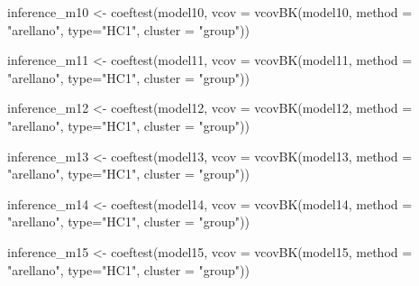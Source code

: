 \documentclass[a4paper,nobind]{templates/ociamthesis}
\newenvironment{Shaded}{\begin{snugshade}}{\end{snugshade}}
\newcommand{\AttributeTok}[1]{\textcolor[rgb]{0.77,0.63,0.00}{#1}}
\newcommand{\FunctionTok}[1]{\textcolor[rgb]{0.00,0.00,0.00}{#1}}
\newcommand{\NormalTok}[1]{#1}
\newcommand{\OtherTok}[1]{\textcolor[rgb]{0.56,0.35,0.01}{#1}}
\newcommand{\StringTok}[1]{\textcolor[rgb]{0.31,0.60,0.02}{#1}}
\renewenvironment{Shaded}
{
  \vspace{10pt}%
  \begin{snugshade}%
}{%
  \end{snugshade}%
  \vspace{8pt}%
}
\begin{document}
\begin{Shaded}
\begin{Highlighting}[]
\NormalTok{inference\_m10 }\OtherTok{\textless{}{-}} \FunctionTok{coeftest}\NormalTok{(model10, }\AttributeTok{vcov =} \FunctionTok{vcovBK}\NormalTok{(model10, }\AttributeTok{method =} \StringTok{"arellano"}\NormalTok{, }\AttributeTok{type=}\StringTok{"HC1"}\NormalTok{, }\AttributeTok{cluster =} \StringTok{"group"}\NormalTok{))}

\NormalTok{inference\_m11 }\OtherTok{\textless{}{-}} \FunctionTok{coeftest}\NormalTok{(model11, }\AttributeTok{vcov =} \FunctionTok{vcovBK}\NormalTok{(model11, }\AttributeTok{method =} \StringTok{"arellano"}\NormalTok{, }\AttributeTok{type=}\StringTok{"HC1"}\NormalTok{, }\AttributeTok{cluster =} \StringTok{"group"}\NormalTok{))}

\NormalTok{inference\_m12 }\OtherTok{\textless{}{-}} \FunctionTok{coeftest}\NormalTok{(model12, }\AttributeTok{vcov =} \FunctionTok{vcovBK}\NormalTok{(model12, }\AttributeTok{method =} \StringTok{"arellano"}\NormalTok{, }\AttributeTok{type=}\StringTok{"HC1"}\NormalTok{, }\AttributeTok{cluster =} \StringTok{"group"}\NormalTok{))}

\NormalTok{inference\_m13 }\OtherTok{\textless{}{-}} \FunctionTok{coeftest}\NormalTok{(model13, }\AttributeTok{vcov =} \FunctionTok{vcovBK}\NormalTok{(model13, }\AttributeTok{method =} \StringTok{"arellano"}\NormalTok{, }\AttributeTok{type=}\StringTok{"HC1"}\NormalTok{, }\AttributeTok{cluster =} \StringTok{"group"}\NormalTok{))}

\NormalTok{inference\_m14 }\OtherTok{\textless{}{-}} \FunctionTok{coeftest}\NormalTok{(model14, }\AttributeTok{vcov =} \FunctionTok{vcovBK}\NormalTok{(model14, }\AttributeTok{method =} \StringTok{"arellano"}\NormalTok{, }\AttributeTok{type=}\StringTok{"HC1"}\NormalTok{, }\AttributeTok{cluster =} \StringTok{"group"}\NormalTok{))}

\NormalTok{inference\_m15 }\OtherTok{\textless{}{-}} \FunctionTok{coeftest}\NormalTok{(model15, }\AttributeTok{vcov =} \FunctionTok{vcovBK}\NormalTok{(model15, }\AttributeTok{method =} \StringTok{"arellano"}\NormalTok{, }\AttributeTok{type=}\StringTok{"HC1"}\NormalTok{, }\AttributeTok{cluster =} \StringTok{"group"}\NormalTok{))}
\end{Highlighting}
\end{Shaded}
\end{document}
